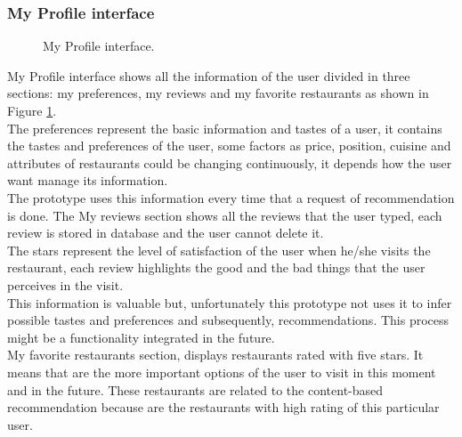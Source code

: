 \subsubsection{My Profile interface}

\begin{figure}
\captionsetup{font=footnotesize}
\centering
{}
\caption{My Profile interface.}
\label{fig:myprofile}   
\end{figure}
My Profile interface shows all the information of the user divided in
three sections: my preferences, my reviews and my favorite restaurants
as shown in Figure  \ref{fig:myprofile}. \\ The preferences represent the basic
information and tastes of a user, it contains the tastes and preferences
of the user, some factors as price, position, cuisine and attributes
of restaurants could be changing continuously, it depends how the user
want manage its information.\\ The prototype uses this information every
time that a request of recommendation is done.
The My reviews section shows all the reviews that the user typed, each
review is stored in database and the user cannot delete it. \\ The stars
represent the level of satisfaction of the user when he/she visits the
restaurant, each review highlights the good and the bad things that
the user perceives in the visit. \\ This information is valuable but,
unfortunately this prototype not uses it to infer possible tastes and
preferences and subsequently, recommendations. This process might be a
functionality integrated in the future.\\
My favorite restaurants section, displays restaurants rated with five
stars. It means that are the more important options of the user to
visit in this moment and in the future. These restaurants are related
to the content-based recommendation because are the restaurants with
high rating of this particular user.

